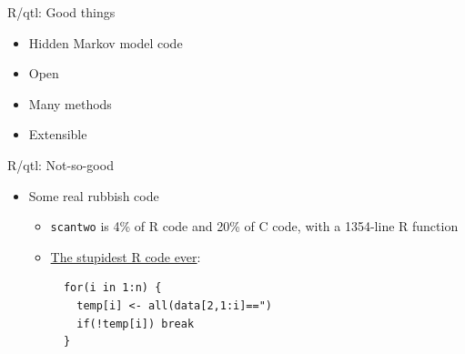 \documentclass[12pt]{article}
\newcommand{\headsize}{\fontsize{35}{35} \selectfont}
\newcommand{\smallsize}{\fontsize{25}{30} \selectfont}
\newcommand{\smallersize}{\fontsize{20}{25} \selectfont}
\begin{document}
{\vspace{15mm}


\newpage


\headsize \color{myyellow}
\hfill \begin{minipage}{5.75in}
\centering
R/qtl: Good things
\end{minipage}

\vspace{25mm}

\color{mywhite}
\smallsize

\hfill \begin{minipage}{10in}
\begin{itemize}
\itemsep24pt
\item Hidden Markov model code

\item Open

\item Many methods

\item Extensible

\end{itemize}
\end{minipage}


\newpage


\headsize \color{myyellow}
\hfill \begin{minipage}{5.75in}
\centering
R/qtl: Not-so-good
\end{minipage}

\vspace{5mm}

\color{mywhite}
\smallsize

\hfill \begin{minipage}{10in}
\begin{itemize}
\itemsep16pt
\item Some real rubbish code

{\smallersize \color{myblue}
\begin{itemize}
\item {\tt scantwo} is 4\% of R code and 20\%
  of C code, with a 1354-line R function

\item \href{http://kbroman.wordpress.com/2011/08/17/the-stupidest-r-code-ever/}{The stupidest R code ever}:
\begin{verbatim}
  for(i in 1:n) {
    temp[i] <- all(data[2,1:i]==")
    if(!temp[i]) break
  }
\end{verbatim}
\end{itemize}
}


\end{itemize}
\end{minipage}}
\end{document}
